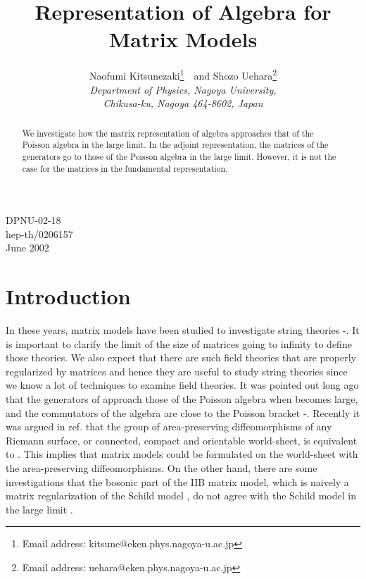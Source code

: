\documentclass[a4paper,12pt]{article}
\begin{document}
\title{Representation of \coordHE{} Algebra for Matrix Models}
\author{{\sc Naofumi Kitsunezaki}\thanks{Email address:
kitsune@eken.phys.nagoya-u.ac.jp}~~and
{\sc Shozo Uehara}\thanks{Email address:
uehara@eken.phys.nagoya-u.ac.jp}\\
{\it Department of Physics, Nagoya University,}\\
{\it Chikusa-ku, Nagoya 464-8602, Japan}}
\date{}
\maketitle
\vspace{-80mm}
\begin{flushright}
	DPNU-02-18\\
	hep-th/0206157\\
	June 2002
\end{flushright}
\vspace{50mm}
\begin{abstract}
We investigate how the matrix representation of \coordHE{} algebra
approaches that of the Poisson algebra in the large \coordHE{} limit.
In the adjoint representation, the \coordHE{} matrices
of the \coordHE{} generators go to those of the Poisson algebra in the
large \coordHE{} limit.
However, it is not the case for the \coordHE{} matrices in the
fundamental representation.
\end{abstract}
\section{Introduction}
In these years, matrix models have been studied to investigate string
theories \cite{BFSS}-\cite{AIKO}.
It is important to clarify the limit of the size of matrices
going to infinity to define those theories. We also expect that
there are such field theories that are properly regularized by
matrices and hence they are useful to study string theories since we
know a lot of techniques to examine field theories.
It was pointed out long ago that the generators of \coordHE{}
approach those of the Poisson algebra when \coordHE{} becomes large, and the
commutators of the \coordHE{} algebra are close to the Poisson bracket
\cite{Hoppe}-\cite{hoppesch}.
Recently it was argued in ref.\cite{zunger} that the group of
area-preserving diffeomorphisms of any Riemann surface, or connected,
compact and orientable world-sheet, is equivalent to \coordHE{}.
This implies that matrix models could be formulated on the world-sheet
with the area-preserving diffeomorphisms.
On the other hand, there are some investigations that the bosonic part
of the IIB matrix model, which is naively a matrix regularization of
the Schild model \cite{Schild:vq}, do not agree with the Schild model
in the large \coordHE{} limit \cite{KU,ANO}.
\end{document}
